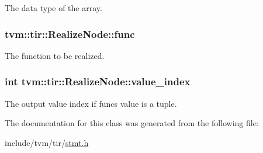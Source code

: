 The data type of the array. 

\subsubsection[{\texorpdfstring{func}{func}}]{ tvm\+::tir\+::\+Realize\+Node\+::func}\hypertarget{classtvm_1_1tir_1_1RealizeNode_ac74657f89ed01d27c42a123aa9c4e1d0}{}\label{classtvm_1_1tir_1_1RealizeNode_ac74657f89ed01d27c42a123aa9c4e1d0}


The function to be realized. 

\subsubsection[{\texorpdfstring{value\+\_\+index}{value_index}}]{\setlength{\rightskip}{0pt plus 5cm}int tvm\+::tir\+::\+Realize\+Node\+::value\+\_\+index}\hypertarget{classtvm_1_1tir_1_1RealizeNode_ab126f401e72fe4b9b1ceee3a9dffaaef}{}\label{classtvm_1_1tir_1_1RealizeNode_ab126f401e72fe4b9b1ceee3a9dffaaef}


The output value index if func\textquotesingle{}s value is a tuple. 



The documentation for this class was generated from the following file\+:\begin{DoxyCompactItemize}
\item 
include/tvm/tir/\hyperlink{stmt_8h}{stmt.\+h}\end{DoxyCompactItemize}
